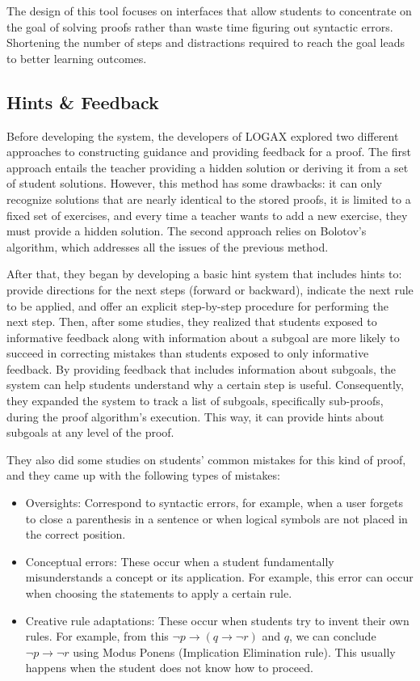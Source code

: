 The design of this tool focuses on interfaces that allow students to concentrate on the goal of solving proofs rather than waste time figuring out syntactic errors. Shortening the number of steps and distractions required to reach the goal leads to better learning outcomes.

\subsection{Hints \& Feedback}
Before developing the system, the developers of LOGAX explored two different approaches to constructing guidance and providing feedback for a proof. The first approach entails the teacher providing a hidden solution or deriving it from a set of student solutions. However, this method has some drawbacks: it can only recognize solutions that are nearly identical to the stored proofs, it is limited to a fixed set of exercises, and every time a teacher wants to add a new exercise, they must provide a hidden solution. The second approach relies on Bolotov's algorithm, which addresses all the issues of the previous method.

After that, they began by developing a basic hint system that includes hints to: provide directions for the next steps (forward or backward), indicate the next rule to be applied, and offer an explicit step-by-step procedure for performing the next step. Then, after some studies, they realized that students exposed to informative feedback along with information about a subgoal are more likely to succeed in correcting mistakes than students exposed to only informative feedback.
By providing feedback that includes information about subgoals, the system can help students understand why a certain step is useful. Consequently, they expanded the system to track a list of subgoals, specifically sub-proofs, during the proof algorithm's execution. This way, it can provide hints about subgoals at any level of the proof.

They also did some studies on students' common mistakes for this kind of proof, and they came up with the following types of mistakes:
\begin{itemize}
    \item Oversights: Correspond to syntactic errors, for example, when a user forgets to close a parenthesis in a sentence or when logical symbols are not placed in the correct position.
    \item Conceptual errors: These occur when a student fundamentally misunderstands a concept or its application. For example, this error can occur when choosing the statements to apply a certain rule.
    \item Creative rule adaptations: These occur when students try to invent their own rules. For example, from this \( \neg p \to (q \to \neg r) \) and \( q \), we can conclude \( \neg p \to \neg r \) using Modus Ponens (Implication Elimination rule). This usually happens when the student does not know how to proceed.
\end{itemize}

